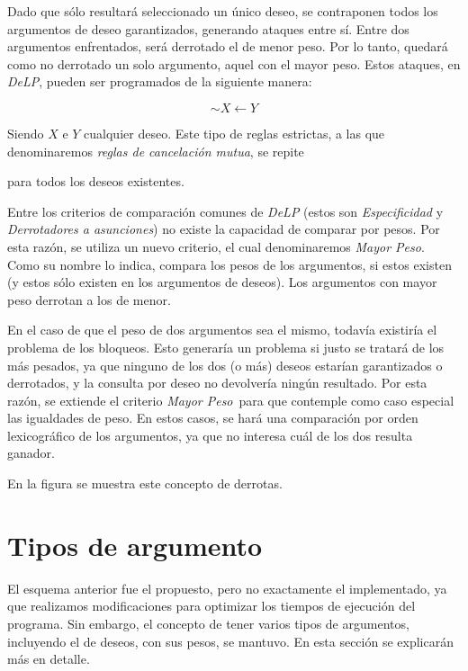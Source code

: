 \documentclass[oneside]{book}
\theoremstyle{definition}
\theoremstyle{example}
\begin{document}
Dado que sólo resultará seleccionado un único deseo, se contraponen todos los argumentos 
de deseo garantizados, generando ataques entre sí. Entre dos argumentos enfrentados, será
derrotado el de menor peso. Por lo tanto, quedará como no derrotado un solo argumento, 
aquel con el mayor peso. Estos ataques, en \textit{DeLP}, pueden ser programados de la 
siguiente manera:

$$ \sim X \leftarrow Y$$ 

Siendo $X$ e $Y$ cualquier deseo. Este tipo de reglas estrictas, a las que
denominaremos \textit{reglas de cancelación mutua}, se repite 

para todos los deseos existentes.

Entre los criterios de comparación comunes de \textit{DeLP} (estos son \textit{Especificidad} y 
\textit{Derrotadores a asunciones}) no existe la capacidad de comparar por pesos. 
Por esta razón, se utiliza un nuevo criterio, el cual 
denominaremos \textit{Mayor Peso}. Como su nombre lo indica, compara los pesos de los 
argumentos, si estos existen (y estos sólo existen en los argumentos de deseos). Los 
argumentos con mayor peso derrotan a los de menor.

En el caso de que el peso de dos argumentos sea el mismo, todavía existiría el problema 
de los bloqueos. Esto generaría un problema si justo se tratará de los más pesados, ya 
que ninguno de los dos (o más) deseos estarían garantizados o derrotados, y la consulta
por deseo no devolvería ningún resultado. Por esta razón, se extiende el criterio 
\textit{Mayor Peso}\ para que contemple como caso especial las igualdades de peso. En 
estos casos, se hará una comparación por orden lexicográfico de los argumentos, ya que
no interesa cuál de los dos resulta ganador. 

En la figura %
se muestra este concepto de derrotas. %


\section{Tipos de argumento}

\label{sec:tiposArgumento}


El esquema anterior fue el propuesto, pero no exactamente el implementado, ya que
realizamos modificaciones para optimizar los tiempos de ejecución del programa. Sin 
embargo, el concepto de tener varios tipos de argumentos, incluyendo el de deseos, con sus
pesos, se mantuvo. En esta sección se explicarán más en detalle.
\end{document}
